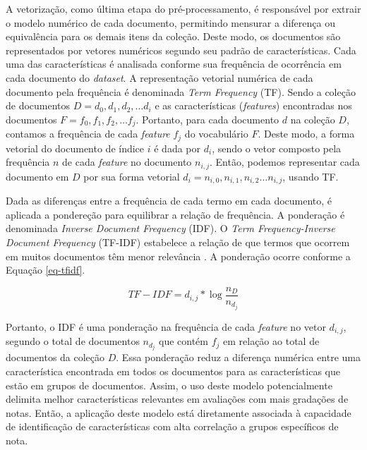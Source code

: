 A vetorização, como última etapa do pré-processamento, é responsável por extrair o modelo numérico de cada documento, permitindo mensurar a diferença ou equivalência para os demais itens da coleção. Deste modo, os documentos são representados por vetores numéricos segundo seu padrão de características. Cada uma das características é analisada conforme sua frequência de ocorrência em cada documento do \textit{dataset}. A representação vetorial numérica de cada documento pela frequência é denominada \textit{Term Frequency} (TF). Sendo a coleção de documentos $ D = { d_{0}, d_{1}, d_{2}, \hdots d_{i} } $ e as características (\textit{features}) encontradas nos documentos $ F = { f_{0}, f_{1}, f_{2}, \hdots f_{j} } $.  Portanto, para cada documento $ d $ na coleção $ D $, contamos a frequência de cada \textit{feature} $ f_{j} $ do vocabulário $ F $. Deste modo, a forma vetorial do documento de índice $ i $ é dada por $ d_{i} $, sendo o vetor composto pela frequência $ n $ de cada \textit{feature} no documento $ n_{i, j} $. Então, podemos representar cada documento em $ D $ por sua forma vetorial $ d_{i} = { n_{i, 0}, n_{i, 1}, n_{i, 2} \hdots n_{i,j}} $, usando TF.

Dada as diferenças entre a frequência de cada termo em cada documento, é aplicada a pondereção para equilibrar a relação de frequência. A ponderação é denominada \textit{Inverse Document Frequency} (IDF). O \textit{Term Frequency-Inverse Document Frequency} (TF-IDF) estabelece a relação de que termos que ocorrem em muitos documentos têm menor relevância \cite{baeza2011}. A ponderação ocorre conforme a Equação \ref{eq-tfidf}.

\begin{equation}
TF-IDF = d_{i,j}* \log \frac{n_{D}}{n_{d_{j}}}
\label{eq-tfidf}
\end{equation}


Portanto, o IDF é uma ponderação na frequência de cada \textit{feature} no vetor $ d_{i, j} $, segundo o total de documentos $ n_{d_{j}} $ que contém $ f_{j} $ em relação ao total de documentos da coleção $ D $. Essa ponderação reduz a diferença numérica entre uma característica encontrada em todos os documentos para as características que estão em grupos de documentos. Assim, o uso deste modelo potencialmente delimita melhor características relevantes em avaliações com mais gradações de notas. Então, a aplicação deste modelo está diretamente associada à capacidade de identificação de características com alta correlação a grupos específicos de nota.

